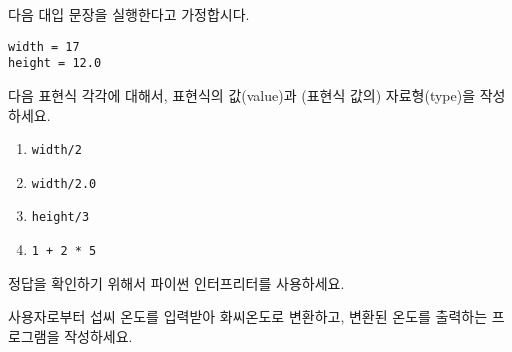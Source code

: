 \begin{ex}
다음 대입 문장을 실행한다고 가정합시다.

\begin{verbatim}
width = 17
height = 12.0
\end{verbatim}

다음 표현식 각각에 대해서, 표현식의 값(value)과 (표현식 값의) 자료형(type)을 작성하세요.

\begin{enumerate}

\item {\tt width/2}

\item {\tt width/2.0}

\item {\tt height/3}

\item {\tt 1 + 2 * 5}

\end{enumerate}

정답을 확인하기 위해서 파이썬 인터프리터를 사용하세요.

\end{ex}

\begin{ex}
사용자로부터 섭씨 온도를 입력받아 화씨온도로 변환하고, 변환된 온도를 출력하는 프로그램을 작성하세요.
\end{ex}


